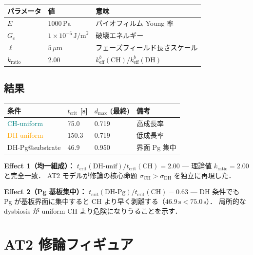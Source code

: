 \documentclass[12pt, a4paper]{article}
\begin{document}
\begin{center}
\begin{tabular}{lll}
\toprule
パラメータ & 値 & 意味 \\
\midrule
$E$ & $1000\,\mathrm{Pa}$ & バイオフィルム Young 率 \\
$G_c$ & $1\times10^{-5}\,\mathrm{J/m}^2$ & 破壊エネルギー \\
$\ell$ & $5\,\mu\mathrm{m}$ & フェーズフィールド長さスケール \\
$k_\mathrm{ratio}$ & $2.00$ & $k_\mathrm{eff}^b(\mathrm{CH})/k_\mathrm{eff}^b(\mathrm{DH})$ \\
\bottomrule
\end{tabular}
\end{center}

\subsection{結果}

\begin{center}
\begin{tabular}{llll}
\toprule
条件 & $t_\mathrm{crit}$ [s] & $d_\mathrm{max}$ (最終) & 備考 \\
\midrule
\textcolor{teal}{CH-uniform}   & 75.0  & 0.719 & 高成長率 \\
\textcolor{orange}{DH-uniform} & 150.3 & 0.719 & 低成長率 \\
DH-Pg@substrate                & 46.9  & 0.950 & 界面 Pg 集中 \\
\bottomrule
\end{tabular}
\end{center}

\medskip
\noindent
\textbf{Effect 1（均一組成）：}
$t_\mathrm{crit}(\mathrm{DH\text{-}unif})/t_\mathrm{crit}(\mathrm{CH}) = \mathbf{2.00}$
— 理論値 $k_\mathrm{ratio} = 2.00$ と完全一致．
AT2 モデルが修論の核心命題 $\sigma_\mathrm{CH} > \sigma_\mathrm{DH}$ を独立に再現した．

\medskip
\noindent
\textbf{Effect 2（Pg 基板集中）：}
$t_\mathrm{crit}(\mathrm{DH\text{-}Pg})/t_\mathrm{crit}(\mathrm{CH}) = 0.63$
— DH 条件でも Pg が基板界面に集中すると CH より早く剥離する（$46.9\,\mathrm{s} < 75.0\,\mathrm{s}$）．
局所的な dysbiosis が uniform CH より危険になりうることを示す．

\section{AT2 修論フィギュア}
\end{document}
